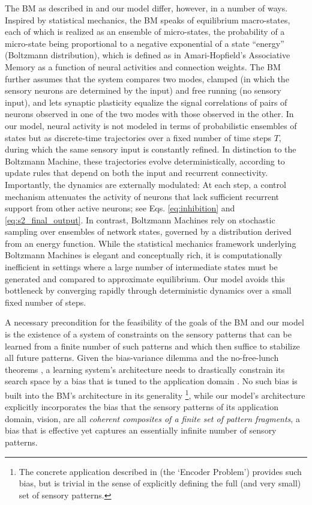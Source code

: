 \documentclass[12pt]{article}
\begin{document}
The BM as described in \citet{hinton_constraint1984} and our model differ, however, in a number of ways.  Inspired by statistical mechanics, the BM speaks of equilibrium macro-states, each of which is realized as an ensemble of micro-states, the probability of a micro-state being proportional to a negative exponential of a state ``energy'' (Boltzmann distribution), which is defined as in Amari-Hopfield's Associative Memory as a function of neural activities and connection weights. The BM further assumes that the system compares two modes, clamped (in which the sensory neurons are determined by the input) and free running (no sensory input), and lets synaptic plasticity equalize the signal correlations of pairs of neurons observed in one of the two modes with those observed in the other.
In our model, neural activity is not modeled in terms of probabilistic ensembles of states but
as discrete-time trajectories over a fixed number of time steps $T$, during which the same sensory input is constantly refined.
In distinction to the Boltzmann Machine, these trajectories evolve deterministically, according to update rules that depend on both the input and recurrent connectivity.
Importantly, the dynamics are externally modulated: At each step, a control mechanism attenuates the activity of neurons that lack sufficient recurrent support from other active neurons;
see Eqs. \ref{eq:inhibition} and \ref{eq:s2_final_output}.
In contrast, Boltzmann Machines rely on stochastic sampling over ensembles of network states, governed by a distribution derived from an energy function. While the statistical mechanics framework underlying Boltzmann Machines is elegant and conceptually rich, it is computationally inefficient in settings where a large number of intermediate states must be generated and compared to approximate equilibrium. Our model avoids this bottleneck by converging rapidly through deterministic dynamics over a small fixed number of steps.

A necessary precondition for the feasibility of the goals of the BM and our model is the existence of a system of constraints on the sensory patterns that can be learned from a finite number of such patterns and which then suffice to stabilize all future patterns.  Given the bias-variance dilemma \citep{Geman1992} and the no-free-lunch theorems \citep{NoFreeLunch}, a learning system's architecture needs to drastically constrain its search space by a bias that is tuned to the application domain \citep{learning1997tom}. No such bias is built into the BM's architecture in its generality \footnote{The concrete application described in \citet{hinton_constraint1984} (the `Encoder Problem') provides such bias, but is trivial in the sense of explicitly defining the full (and very small) set of sensory patterns.}, while our model's architecture explicitly incorporates the bias that the sensory patterns of its application domain, vision, are all \emph{coherent composites of a finite set of pattern fragments}, a bias that is effective yet captures an essentially infinite number of sensory patterns.
\end{document}
